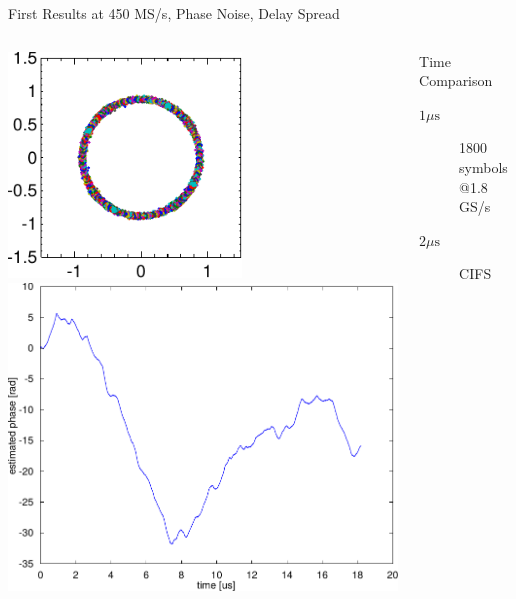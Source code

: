 \documentclass[10pt]{beamer}
\begin{document}
\begin{frame}{First Results at 450 MS/s, Phase Noise, Delay Spread}
  \begin{columns}[T]
    \begin{column}{.5\textwidth}
      \centering
      \includegraphics[width=0.6\textwidth]{figures/matlab/res_450_qam4_pnoise} \\
      \includegraphics[width=\textwidth]{figures/matlab/res_450_qam4_phase_est} \\
    \end{column}
    \begin{column}{.5\textwidth}
      \centering
      \begin{block}{Time Comparison}
        \begin{description}
        \item[$1 \mu \text{s}$] 1800 symbols @1.8 GS/s
        \item[$2 \mu \text{s}$] CIFS
        \end{description}
      \end{block}


\end{column}
\end{columns}
\end{frame}
\end{document}
